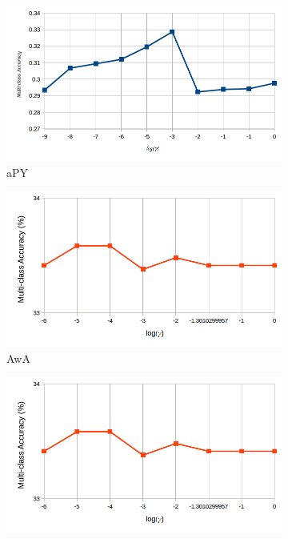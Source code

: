 \begin{figure}[!th]
\centering
\begin{subfigure}[b]{0.43\linewidth}
    \includegraphics[width=\linewidth]{images/nn_param_apy}
    \caption{aPY}
\end{subfigure}
%
\begin{subfigure}[b]{0.43\linewidth}
    \includegraphics[width=\linewidth]{images/nn_param_birds}
    \caption{AwA}
    \label{fig:cluster_params_beta}
\end{subfigure}
%
\begin{subfigure}[b]{0.43\linewidth}
    \includegraphics[width=\linewidth]{images/nn_param_birds}

\end{subfigure}
\end{figure}
